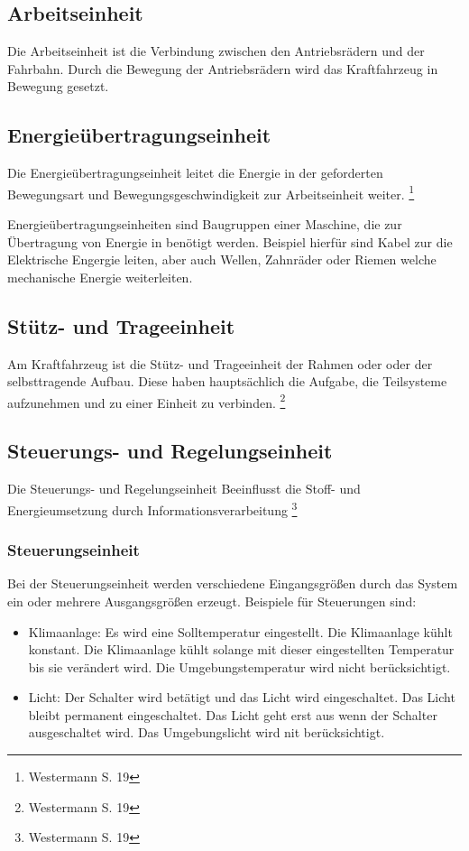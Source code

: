 \subsection{Arbeitseinheit}
Die Arbeitseinheit ist die Verbindung zwischen den Antriebsrädern und der Fahrbahn.
Durch die Bewegung der Antriebsrädern wird das Kraftfahrzeug in Bewegung gesetzt.

\subsection{Energieübertragungseinheit}
Die Energieübertragungseinheit leitet die Energie in der geforderten Bewegungsart und Bewegungsgeschwindigkeit zur Arbeitseinheit weiter.
\footnote{Westermann S. 19}

Energieübertragungseinheiten sind Baugruppen einer Maschine, die zur Übertragung von Energie in benötigt werden.
Beispiel hierfür sind Kabel zur die Elektrische Engergie leiten, aber auch Wellen, Zahnräder oder Riemen welche mechanische Energie weiterleiten.

\subsection{Stütz- und Trageeinheit}
Am Kraftfahrzeug ist die Stütz- und Trageeinheit der Rahmen oder oder der selbsttragende Aufbau.
Diese haben hauptsächlich die Aufgabe, die Teilsysteme aufzunehmen und zu einer Einheit zu verbinden.
\footnote{Westermann S. 19}


\subsection{Steuerungs- und Regelungseinheit}
Die Steuerungs- und Regelungseinheit Beeinflusst die Stoff- und Energieumsetzung durch Informationsverarbeitung
\footnote{Westermann S. 19}

\subsubsection{Steuerungseinheit}
Bei der Steuerungseinheit werden verschiedene Eingangsgrößen durch das System ein oder mehrere Ausgangsgrößen erzeugt.
Beispiele für Steuerungen sind:
\begin{itemize}
	\item Klimaanlage: Es wird eine Solltemperatur eingestellt.
	      Die Klimaanlage kühlt konstant.
	      Die Klimaanlage kühlt solange mit dieser eingestellten Temperatur bis sie verändert wird.
	      Die Umgebungstemperatur wird nicht berücksichtigt.
	\item Licht: Der Schalter wird betätigt und das Licht wird eingeschaltet.
	      Das Licht bleibt permanent eingeschaltet.
	      Das Licht geht erst aus wenn der Schalter ausgeschaltet wird.
	      Das Umgebungslicht wird nit berücksichtigt.
\end{itemize}
